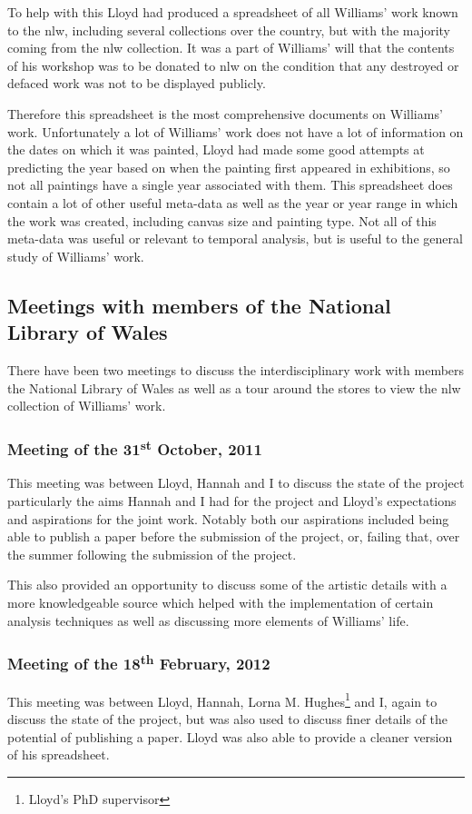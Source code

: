 To help with this Lloyd had produced a spreadsheet of all Williams' work known to the \gls{nlw}, 
including several collections over the country, but with the majority coming from the \gls{nlw}
collection. It was a part of Williams' will that the contents of his workshop was to be donated
to \gls{nlw} on the condition that any destroyed or defaced work was not to be displayed publicly.

Therefore this spreadsheet is the most comprehensive documents on Williams' work. Unfortunately a
lot of Williams' work does not have a lot of information on the dates on which it was painted, 
Lloyd had made some good attempts at predicting the year based on when the painting first appeared
in exhibitions, so not all paintings have a single year associated with them. This spreadsheet 
does contain a lot of other useful meta-data as well as the year or year range in which the work 
was created, including canvas size and painting type. Not all of this meta-data was useful or 
relevant to temporal analysis, but is useful to the general study of Williams' work.

\subsection{Meetings with members of the National Library of Wales}

There have been two meetings to discuss the interdisciplinary work with members the National 
Library of Wales as well as a tour around the stores to view the \gls{nlw} collection of Williams'
work.


\subsubsection{Meeting of the 31\textsuperscript{st} October, 2011}
This meeting was between Lloyd, Hannah and I to discuss the state of the project particularly the
aims Hannah and I had for the project and Lloyd's expectations and aspirations for the joint
work. Notably both our aspirations included being able to publish a paper before the submission of
the project, or, failing that, over the summer following the submission of the project.

This also provided an opportunity to discuss some of the artistic details with a more 
knowledgeable source which helped with the implementation of certain analysis techniques as well
as discussing more elements of Williams' life.


\subsubsection{Meeting of the 18\textsuperscript{th} February, 2012}
This meeting was between Lloyd, Hannah, Lorna M. Hughes\footnote{Lloyd's PhD supervisor} and I, again to discuss
the state of the project, but was also used to discuss finer details of the potential of 
publishing a paper. Lloyd was also able to provide a cleaner version of his spreadsheet.

